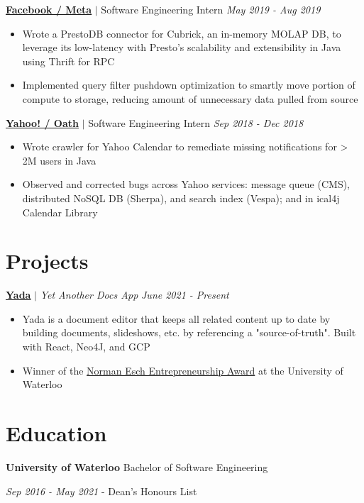 \documentclass[paper=a4,fontsize=15pt]{scrartcl}
\newcommand{\quarterspace}{\vspace*{0.25em}}
\newcommand{\bighalfspace}{\vspace*{0.75em}}
\begin{document}
\bighalfspace
\normalsize
\noindent \href{https://facebook.com}{\textbf{\ul{Facebook / Meta}}}
$\vert$ \small Software Engineering Intern
{\hfill \footnotesize \textit{May 2019 - Aug 2019}}
\begin{itemize}[noitemsep,leftmargin=20pt,label=\raisebox{0.25ex}{\tiny$\bullet$},topsep=5pt]
  \small
    \item Wrote a PrestoDB connector for Cubrick, an in-memory MOLAP DB, to leverage its low-latency with Presto's scalability and extensibility in Java using Thrift for RPC
    \item Implemented query filter pushdown optimization to smartly move portion of compute to storage, reducing amount of unnecessary data pulled from source
\end{itemize}

\bighalfspace
\normalsize
\noindent \href{https://mail.yahoo.com}{\textbf{\ul{Yahoo! / Oath}}}
$\vert$ \small Software Engineering Intern
{\hfill \footnotesize \textit{Sep 2018 - Dec 2018}}
\begin{itemize}[noitemsep,leftmargin=20pt,label=\raisebox{0.25ex}{\tiny$\bullet$},topsep=5pt]
  \small
    \item Wrote crawler for Yahoo Calendar to remediate missing notifications for > 2M users in Java
    \item Observed and corrected bugs across Yahoo services: message queue (CMS), distributed NoSQL DB (Sherpa), and search index (Vespa); and in ical4j Calendar Library
\end{itemize}

 \section*{Projects}{}
\normalsize
\noindent \href{https://uwaterloo.ca/news/engineering-entrepreneurship/innovation-shines-engineering-pitch-contest}{\textbf{\ul{Yada}}}
$\vert$ \small \textit{Yet Another Docs App}
{\hfill \footnotesize \textit{June 2021 - Present}}
\begin{itemize}[noitemsep,leftmargin=20pt,label=\raisebox{0.25ex}{\tiny$\bullet$},topsep=5pt]
    \small
    
    \item Yada is a document editor that keeps all related content up to date by building documents, slideshows, etc. by referencing a "source-of-truth". Built with React, Neo4J, and GCP
    \item Winner of the \href{https://uwaterloo.ca/software-engineering/news/se-capstone-project-wins-10k-esch-award}{Norman Esch Entrepreneurship Award} at the University of Waterloo
\end{itemize}

\section*{Education}{}
\noindent \textbf{University of Waterloo} Bachelor of Software Engineering \par
\quarterspace
\footnotesize
\noindent \textit{Sep 2016 - May 2021} - Dean's Honours List
\end{document}
